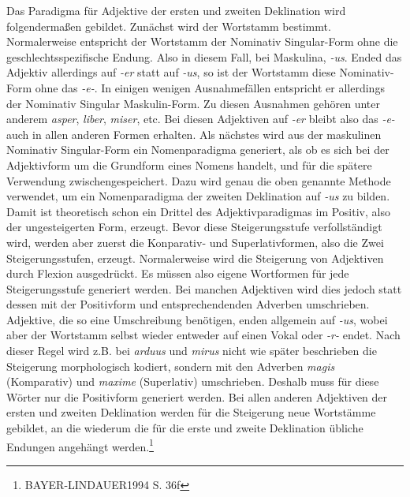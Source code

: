 \documentclass[12pt,abstract=on]{scrreprt}
\begin{document}
Das Paradigma für Adjektive der ersten und zweiten Deklination wird folgendermaßen gebildet. Zunächst wird der Wortstamm bestimmt. Normalerweise entspricht der Wortstamm der Nominativ Singular-Form ohne die geschlechtsspezifische Endung. Also in diesem Fall, bei Maskulina, \textit{-us}. Ended das Adjektiv allerdings auf \textit{-er} statt auf \textit{-us}, so ist der Wortstamm diese Nominativ-Form ohne das \textit{-e-}. In einigen wenigen Ausnahmefällen entspricht er allerdings der Nominativ Singular Maskulin-Form. Zu diesen Ausnahmen gehören unter anderem \textit{asper}, \textit{liber}, \textit{miser}, etc. Bei diesen Adjektiven auf \textit{-er} bleibt also das \textit{-e-} auch in allen anderen Formen erhalten. Als nächstes wird aus der maskulinen Nominativ Singular-Form ein Nomenparadigma generiert, als ob es sich bei der Adjektivform um die Grundform eines Nomens handelt, und für die spätere Verwendung zwischengespeichert. Dazu wird genau die oben genannte Methode verwendet, um ein Nomenparadigma der zweiten Deklination auf \textit{-us} zu bilden. Damit ist theoretisch schon ein Drittel des Adjektivparadigmas im Positiv, also der ungesteigerten Form, erzeugt. Bevor diese Steigerungsstufe verfollständigt wird, werden aber zuerst die Konparativ- und Superlativformen, also die Zwei Steigerungsstufen, erzeugt. Normalerweise wird die Steigerung von Adjektiven durch Flexion ausgedrückt. Es müssen also eigene Wortformen für jede Steigerungsstufe generiert werden. Bei manchen Adjektiven wird dies jedoch statt dessen mit der Positivform und entsprechendenden Adverben umschrieben. Adjektive, die so eine Umschreibung benötigen, enden allgemein auf \textit{-us}, wobei aber der Wortstamm selbst wieder entweder auf einen Vokal oder \textit{-r-} endet. Nach dieser Regel wird z.B. bei \textit{arduus} und \textit{mirus} nicht wie später beschrieben die Steigerung morphologisch kodiert, sondern mit den Adverben \textit{magis} (Komparativ) und \textit{maxime} (Superlativ) umschrieben. Deshalb muss für diese Wörter nur die Positivform generiert werden. Bei allen anderen Adjektiven der ersten und zweiten Deklination werden für die Steigerung neue Wortstämme gebildet, an die wiederum die für die erste und zweite Deklination übliche Endungen angehängt werden.\footnote{BAYER-LINDAUER1994 S. 36f} \par
\end{document}
